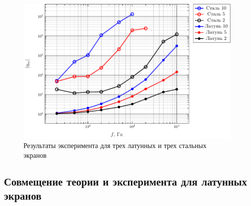 \documentclass[a4paper,12pt]{article}
\begin{document}
\begin{figure}[H]
	\centering
	\includegraphics[scale=1]{plots/eta}
	\caption{Результаты эксперимента для трех латунных и трех стальных экранов}
	\label{fig:all}
\end{figure}

\subsection{Совмещение теории и эксперимента для латунных экранов}
\end{document}
